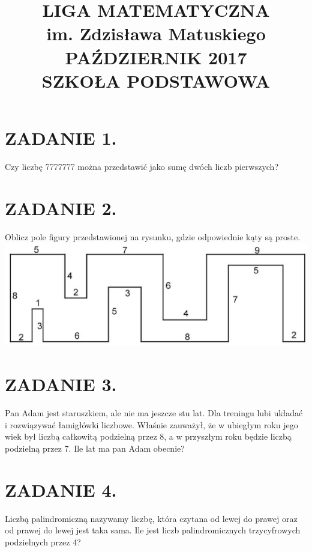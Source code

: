 \documentclass[10pt]{article}
\title{LIGA MATEMATYCZNA \\
 im. Zdzisława Matuskiego \\
 PAŹDZIERNIK 2017 \\
 SZKOŁA PODSTAWOWA }
\author{}
\date{}
\begin{document}
\maketitle
\section*{ZADANIE 1.}
Czy liczbę 7777777 można przedstawić jako sumę dwóch liczb pierwszych?

\section*{ZADANIE 2.}
Oblicz pole figury przedstawionej na rysunku, gdzie odpowiednie kąty są proste.\\
\includegraphics[max width=\textwidth, center]{2024_11_21_a5b230033f508f480714g-1(1)}

\section*{ZADANIE 3.}
Pan Adam jest staruszkiem, ale nie ma jeszcze stu lat. Dla treningu lubi układać i rozwiązywać łamigłówki liczbowe. Właśnie zauważył, że w ubiegłym roku jego wiek był liczbą całkowitą podzielną przez 8, a w przyszłym roku będzie liczbą podzielną przez 7. Ile lat ma pan Adam obecnie?

\section*{ZADANIE 4.}
Liczbą palindromiczną nazywamy liczbę, która czytana od lewej do prawej oraz od prawej do lewej jest taka sama. Ile jest liczb palindromicznych trzycyfrowych podzielnych przez 4?
\end{document}

